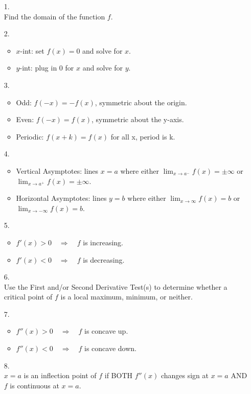 \documentclass[handout,nooutcomes]{ximera}
\begin{document}
\begin{enumerate}

\item[1.]    \\
	Find the domain of the function $f$.

\item[2.]  
	\begin{itemize}
		\item $x$-int: set $f(x)=0$ and solve for $x$.
		\item $y$-int: plug in 0 for $x$ and solve for $y$.
	\end{itemize}

\item[3.]   
	\begin{itemize}
		\item  Odd:  $f(-x)=-f(x)$, symmetric about the origin.
		\item  Even:  $f(-x)=f(x)$, symmetric about the y-axis.
		\item  Periodic:  $f(x+k)=f(x)$ for all x, period is k.
	\end{itemize}

\item[4.]   
	\begin{itemize}
		\item  Vertical Asymptotes:  lines $x=a$ where either $\lim_{x \to a^-} f(x) = \pm \infty$ or $\lim_{x \to a^+} f(x) = \pm \infty$.
		\item  Horizontal Asymptotes:  lines $y=b$ where either $\lim_{x \to \infty} f(x) = b $ or $\lim_{x \to -\infty} f(x) = b $.
	\end{itemize}
	
\item[5.]  
	\begin{itemize}
		\item  $f'(x) > 0 \quad \Longrightarrow \quad f$ is increasing.
		\item  $f'(x) < 0 \quad \Longrightarrow \quad f$ is decreasing.
	\end{itemize}
\item[6.]    \\
	Use the First and/or Second Derivative Test(s) to determine whether a critical point of $f$ is a local maximum, minimum, or neither.
	
\item[7.]  
	\begin{itemize}
		\item  $f''(x) > 0 \quad \Longrightarrow \quad f$ is concave up.
		\item  $f''(x) < 0 \quad \Longrightarrow \quad f$ is concave down.
	\end{itemize}

\item[8.]    \\
	$x=a$ is an inflection point of $f$ if BOTH $f''(x)$ changes sign at $x=a$ AND $f$ is continuous at $x=a$.

\end{enumerate}
\end{document}
